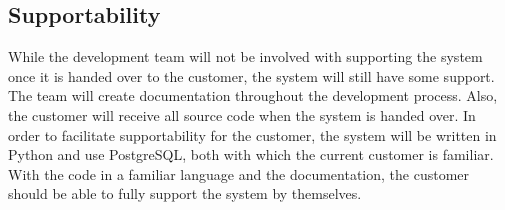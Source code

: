 \subsection{Supportability}
While the development team will not be involved with supporting the system once it is handed over to the customer, the system will still have some support.  The team will create documentation throughout the development process. Also, the customer will receive all source code when the system is handed over.  In order to facilitate supportability for the customer, the system will be written in Python and use PostgreSQL, both with which the current customer is familiar.  With the code in a familiar language and the documentation, the customer should be able to fully support the system by themselves.
